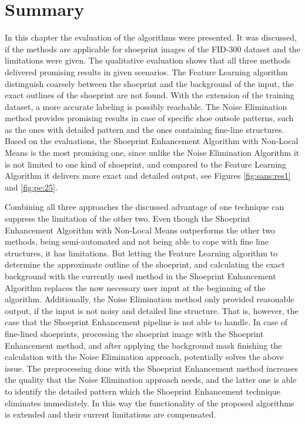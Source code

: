 \documentclass[draft,final]{vutinfth} %
\begin{document}
\section{Summary}
\par
In this chapter the evaluation of the algorithms were presented.
It was discussed, if the methods are applicable for shoeprint images of the FID-300 dataset and the limitations were given.
The qualitative evaluation shows that all three methods delivered promising results in given scenarios.
The Feature Learning algorithm distinguish coarsely between the shoeprint and the background of the input, the exact outlines of the shoeprint are not found.
With the extension of the training dataset, a more accurate labeling is possibly reachable.
The Noise Elimination method provides promising results in case of specific shoe outsole patterns, such as the ones with detailed pattern and the ones containing fine-line structures.
Based on the evaluations, the Shoeprint Enhancement Algorithm with Non-Local Means is the most promising one, since unlike the Noise Elimination Algorithm it is not limited to one kind of shoeprint, and compared to the Feature Learning Algorithm it delivers more exact and detailed output, see Figures \ref{fig:sans:res1} and \ref{fig:pe:25}.
\par
Combining all three approaches the discussed advantage of one technique can suppress the limitation of the other two.
Even though the Shoeprint Enhancement Algorithm with Non-Local Means outperforms the other two methods, being semi-automated and not being able to cope with fine line structures, it has limitations. 
But letting the Feature Learning algorithm to determine the approximate outline of the shoeprint, and calculating the exact background with the currently used method in the Shoeprint Enhancement Algorithm replaces the now necessary user input at the beginning of the algorithm.
Additionally, the Noise Elimination method only provided reasonable output, if the input is not noisy and detailed line structure.
That is, however, the case that the Shoeprint Enhancement pipeline is not able to handle. 
In case of fine-lined shoeprints, processing the shoeprint image with the Shoeprint Enhancement method, and after applying the background mask finishing the calculation with the Noise Elimination approach, potentially solves the above issue.
The preprocessing done with the Shoeprint Enhancement method increases the quality that the Noise Elimination approach needs, and the latter one is able to identify the detailed pattern which the Shoeprint Enhancement technique eliminates immediately.
In this way the functionality of the proposed algorithms is extended and their current limitations are compensated.
\end{document}
